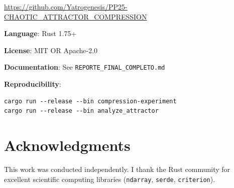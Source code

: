 \documentclass[11pt,a4paper]{article}
\begin{document}
\url{https://github.com/Yatrogenesis/PP25-CHAOTIC_ATTRACTOR_COMPRESSION}

\textbf{Language}: Rust 1.75+

\textbf{License}: MIT OR Apache-2.0

\textbf{Documentation}: See \texttt{REPORTE\_FINAL\_COMPLETO.md}

\textbf{Reproducibility}:
\begin{verbatim}
cargo run --release --bin compression-experiment
cargo run --release --bin analyze_attractor
\end{verbatim}

\section*{Acknowledgments}

This work was conducted independently. I thank the Rust community for excellent scientific computing libraries (\texttt{ndarray}, \texttt{serde}, \texttt{criterion}).
\end{document}
